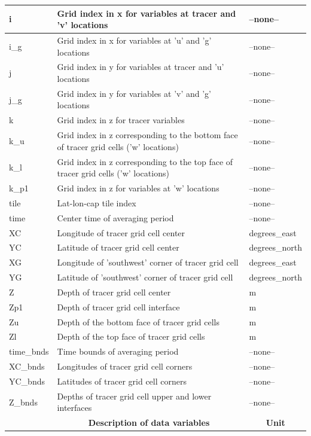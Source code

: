 \begin{longtable}{|m{}|m{}|m{}|}
i &Grid index in x for variables at tracer and 'v' locations &--none--  \\ \hline
i\_g &Grid index in x for variables at 'u' and 'g' locations &--none--  \\ \hline
j &Grid index in y for variables at tracer and 'u' locations &--none--  \\ \hline
j\_g &Grid index in y for variables at 'v' and 'g' locations &--none--  \\ \hline
k &Grid index in z for tracer variables &--none--  \\ \hline
k\_u &Grid index in z corresponding to the bottom face of tracer grid cells ('w' locations) &--none--  \\ \hline
k\_l &Grid index in z corresponding to the top face of tracer grid cells ('w' locations) &--none--  \\ \hline
k\_p1 &Grid index in z for variables at 'w' locations &--none--  \\ \hline
tile &Lat-lon-cap tile index &--none--  \\ \hline
time &Center time of averaging period &--none--  \\ \hline
XC &Longitude of tracer grid cell center &degrees\_east  \\ \hline
YC &Latitude of tracer grid cell center &degrees\_north  \\ \hline
XG &Longitude of 'southwest' corner of tracer grid cell &degrees\_east  \\ \hline
YG &Latitude of 'southwest' corner of tracer grid cell &degrees\_north  \\ \hline
Z &Depth of tracer grid cell center &m  \\ \hline
Zp1 &Depth of tracer grid cell interface &m  \\ \hline
Zu &Depth of the bottom face of tracer grid cells &m  \\ \hline
Zl &Depth of the top face of tracer grid cells &m  \\ \hline
time\_bnds &Time bounds of averaging period &--none--  \\ \hline
XC\_bnds &Longitudes of tracer grid cell corners &--none--  \\ \hline
YC\_bnds &Latitudes of tracer grid cell corners &--none--  \\ \hline
Z\_bnds &Depths of tracer grid cell upper and lower interfaces &--none--  \\ \hline
\rowcolor{lightgray} \multicolumn{1}{|c|}{\textbf{Variables}} & \multicolumn{1}{|c|}{\textbf{Description of data variables}} &  \multicolumn{1}{|c|}{\textbf{Unit}}\\ \hline

\end{longtable}
